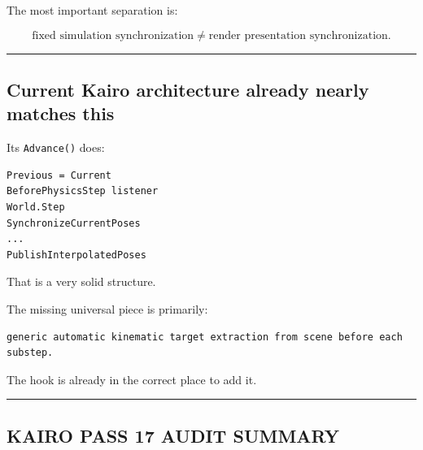 The most important separation is:

\[
\boxed{
\text{fixed simulation synchronization}
\neq
\text{render presentation synchronization}.
}
\]

\begin{center}\rule{0.5\linewidth}{0.5pt}\end{center}

\subsection{Current Kairo architecture already nearly matches this}\label{06-engine-ii-ch038-current-kairo-architecture-already-nearly-matches-this}

Its \texttt{Advance()} does:

\begin{verbatim}
Previous = Current
BeforePhysicsStep listener
World.Step
SynchronizeCurrentPoses
...
PublishInterpolatedPoses
\end{verbatim}

That is a very solid structure.

The missing universal piece is primarily:

\begin{verbatim}
generic automatic kinematic target extraction from scene before each substep.
\end{verbatim}

The hook is already in the correct place to add it.

\begin{center}\rule{0.5\linewidth}{0.5pt}\end{center}

\subsection{KAIRO PASS 17 AUDIT SUMMARY}\label{06-engine-ii-ch038-kairo-pass-17-audit-summary}

